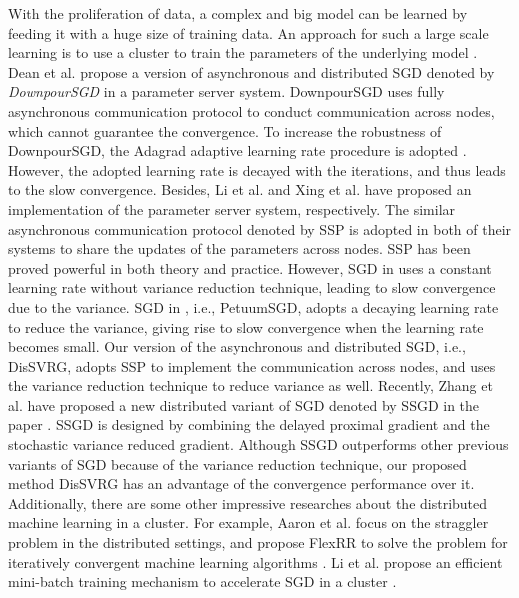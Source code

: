 \documentclass[preprint,review,11pt,a4paper]{elsarticle}
\begin{document}
With the proliferation of data, a complex and big model can be learned by feeding it with a huge size of training data. An approach for such a large scale learning is to use a cluster to train the parameters of the underlying model \cite{Dean:2012wx, Li:2014tt, Xing:2015ib}. Dean et al. propose a version of asynchronous and distributed SGD denoted by \emph{DownpourSGD} in a parameter server system. DownpourSGD uses fully asynchronous communication protocol to conduct communication across nodes, which cannot guarantee the convergence. To increase the robustness of DownpourSGD, the Adagrad adaptive learning rate procedure is adopted \cite{Cavalcante:2009il}. However, the adopted learning rate is decayed with the iterations, and thus leads to the slow convergence. Besides, Li et al. and Xing et al. have proposed an implementation of the parameter server system, respectively.  The similar asynchronous communication protocol denoted by SSP is adopted in both of their systems to share the updates of the parameters across nodes. SSP has been proved powerful in both theory and practice.  However, SGD in \cite{Li:2014tt} uses a constant learning rate without variance reduction technique, leading to slow convergence due to the variance. SGD in \cite{Xing:2015ib}, i.e., PetuumSGD, adopts a decaying learning rate to reduce the variance, giving rise to slow convergence when the learning rate becomes small. Our version of the asynchronous and distributed SGD, i.e., DisSVRG, adopts SSP to implement the communication across nodes, and uses the variance reduction technique  to reduce variance as well. Recently, Zhang et al. have proposed a new distributed variant of SGD denoted by SSGD in the paper \cite{Zhang:2015tp}.  SSGD is designed by combining the delayed proximal gradient and the stochastic variance reduced gradient. Although SSGD outperforms other previous variants of SGD because of the variance reduction technique, our proposed method DisSVRG has an advantage of the convergence performance over it. Additionally, there are some other impressive researches about the distributed machine learning in a cluster. For example, Aaron et al. focus on the straggler problem in the distributed settings, and propose FlexRR to solve the problem for iteratively convergent machine learning algorithms \cite{Harlap:2016ia}.  Li et al. propose an efficient mini-batch training mechanism to accelerate SGD in a cluster  \cite{Li:2014jg}. 
\end{document}
